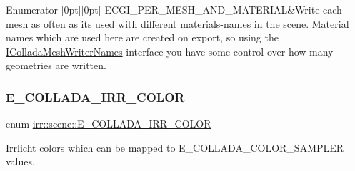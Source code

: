 \begin{DoxyEnumFields}{Enumerator}
[0pt][0pt]{}\mbox{\label{namespaceirr_1_1scene_a179008e7c02889459edf81394dbd6959ae673e963bed1f4bea0acbe4c02fe23de}} 
E\+C\+G\+I\+\_\+\+P\+E\+R\+\_\+\+M\+E\+S\+H\+\_\+\+A\+N\+D\+\_\+\+M\+A\+T\+E\+R\+I\+AL&Write each mesh as often as it\textquotesingle{}s used with different materials-\/names in the scene. Material names which are used here are created on export, so using the \hyperlink{classirr_1_1scene_1_1IColladaMeshWriterNames}{I\+Collada\+Mesh\+Writer\+Names} interface you have some control over how many geometries are written. \\
\hline

\end{DoxyEnumFields}
\mbox{\label{namespaceirr_1_1scene_a61cba210038d6d843b81d9282f1cac7e}} 
\subsubsection{\texorpdfstring{E\+\_\+\+C\+O\+L\+L\+A\+D\+A\+\_\+\+I\+R\+R\+\_\+\+C\+O\+L\+OR}{E\_COLLADA\_IRR\_COLOR}\hspace{0.1cm}{\footnotesize\ttfamily [1/2]}}
{\footnotesize\ttfamily enum \hyperlink{namespaceirr_1_1scene_a61cba210038d6d843b81d9282f1cac7e}{irr\+::scene\+::\+E\+\_\+\+C\+O\+L\+L\+A\+D\+A\+\_\+\+I\+R\+R\+\_\+\+C\+O\+L\+OR}}



Irrlicht colors which can be mapped to E\+\_\+\+C\+O\+L\+L\+A\+D\+A\+\_\+\+C\+O\+L\+O\+R\+\_\+\+S\+A\+M\+P\+L\+ER values. 

